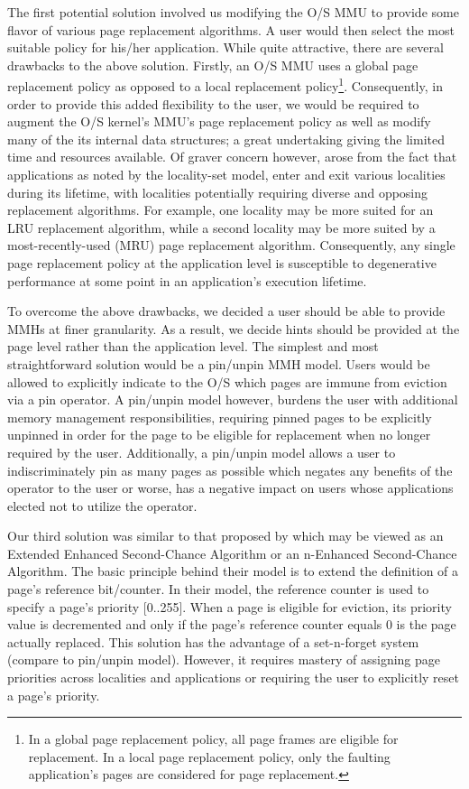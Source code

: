 \documentclass[10pt,a4paper,twocolumn]{article}
\begin{document}
The first potential solution involved us modifying the O/S MMU to provide some flavor of various
page replacement algorithms.  A user would then select the most suitable policy for his/her
application. While quite attractive, there are several drawbacks to the above solution. Firstly, an
O/S MMU uses a global page replacement policy as opposed to a local replacement policy\footnote{In a
global page replacement policy, all page frames are eligible for replacement. In a local page
replacement policy, only the faulting application's pages are considered for page replacement.}.
Consequently, in order to provide this added flexibility to the user, we would be required to
augment the O/S kernel's MMU's page replacement policy as well as modify many of the its internal
data structures; a great undertaking giving the limited time and resources available. Of graver
concern however, arose from the fact that applications as noted by the locality-set model, enter and
exit various localities during its lifetime, with localities potentially requiring diverse and
opposing replacement algorithms.  For example, one locality may be more suited for an LRU
replacement algorithm, while a second locality may be more suited by a most-recently-used (MRU) page
replacement algorithm. Consequently, any single page replacement policy at the application level is
susceptible to degenerative performance at some point in an application's execution lifetime.

To overcome the above drawbacks, we decided a user should be able to provide MMHs at finer
granularity. As a result, we decide hints should be provided at the page level rather than the
application level. The simplest and most straightforward solution would be a pin/unpin MMH model.
Users would be allowed to explicitly indicate to the O/S which pages are immune from eviction via a
pin operator.  A pin/unpin model however, burdens the user with additional memory management
responsibilities, requiring pinned pages to be explicitly unpinned in order for the page to be
eligible for replacement when no longer required by the user. Additionally, a pin/unpin model allows
a user to indiscriminately pin as many pages as possible which negates any benefits of the operator
to the user or worse, has a negative impact on users whose applications elected not to utilize the
operator.

Our third solution was similar to that proposed by \cite{NEU} which may be viewed as an
Extended Enhanced Second-Chance Algorithm or an n-Enhanced Second-Chance Algorithm. The basic
principle behind their model is to extend the definition of a page's reference bit/counter. In their
model, the reference counter is used to specify a page's priority [0..255]. When a page is eligible
for eviction, its priority value is decremented and only if the page's reference counter equals 0 is
	the page actually replaced. This solution has the advantage of a set-n-forget system (compare to
	pin/unpin model). However, it requires mastery of assigning page priorities across localities
	and applications or requiring the user to explicitly reset a page's priority.
\end{document}
